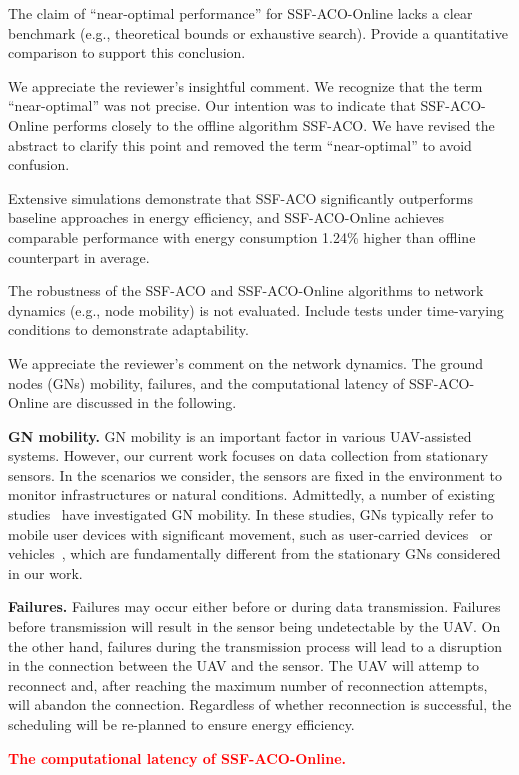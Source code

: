 \begin{revcomment}
	The claim of ``near-optimal performance'' for SSF-ACO-Online lacks a clear benchmark (e.g., theoretical bounds or exhaustive search). Provide a quantitative comparison to support this conclusion.
\end{revcomment}
\begin{revresponse}
	We appreciate the reviewer's insightful comment.
	We recognize that the term ``near-optimal'' was not precise. Our intention was to indicate that SSF-ACO-Online performs closely to the offline algorithm SSF-ACO. We have revised the abstract to clarify this point and removed the term ``near-optimal'' to avoid confusion.
	\begin{changes}
		Extensive simulations demonstrate that SSF-ACO significantly outperforms baseline approaches in energy efficiency, and SSF-ACO-Online achieves comparable performance with energy consumption 1.24\% higher than offline counterpart in average.
	\end{changes}
\end{revresponse}

\begin{revcomment}
	The robustness of the SSF-ACO and SSF-ACO-Online algorithms to network dynamics (e.g., node mobility) is not evaluated. Include tests under time-varying conditions to demonstrate adaptability.
\end{revcomment}
\begin{revresponse}
	We appreciate the reviewer's comment on the network dynamics.
	The ground nodes (GNs) mobility, failures, and the computational latency of SSF-ACO-Online are discussed in the following.

	\textbf{GN mobility.}
	GN mobility is an important factor in various UAV-assisted systems.
	However, our current work focuses on data collection from stationary sensors.
	In the scenarios we consider, the sensors are fixed in the environment to monitor infrastructures or natural conditions.
	Admittedly, a number of existing studies~\cite{GNmob1, GNmob2, GNmob3, GNmob4} have investigated GN mobility.
	In these studies, GNs typically refer to mobile user devices with significant movement, such as user-carried devices~\cite{GNmob1,GNmob2} or vehicles~\cite{GNmob3,GNmob4}, which are fundamentally different from the stationary GNs considered in our work.

	\textbf{Failures.}
	Failures may occur either before or during data transmission.
	Failures before transmission will result in the sensor being undetectable by the UAV.
	On the other hand, failures during the transmission process will lead to a disruption in the connection between the UAV and the sensor.
	The UAV will attemp to reconnect and, after reaching the maximum number of reconnection attempts, will abandon the connection.
	Regardless of whether reconnection is successful, the scheduling will be re-planned to ensure energy efficiency.

	\textcolor{red}{\textbf{The computational latency of SSF-ACO-Online.}}
\end{revresponse}

